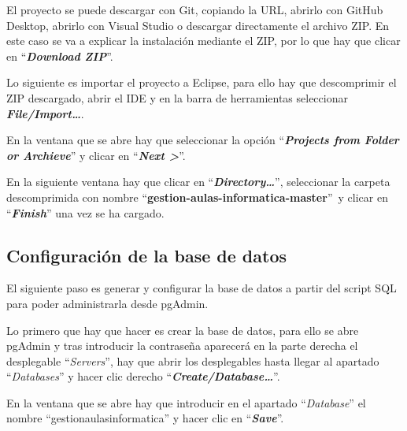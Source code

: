 El proyecto se puede descargar con Git, copiando la URL, abrirlo con GitHub Desktop, abrirlo con Visual Studio o descargar directamente el archivo ZIP. En este caso se va a explicar la instalación mediante el ZIP, por lo que hay que clicar en ``\textbf{\textit{Download ZIP}}''.


Lo siguiente es importar el proyecto a Eclipse, para ello hay que descomprimir el ZIP descargado, abrir el IDE y en la barra de herramientas seleccionar \textbf{\textit{File/Import\dots}}.


En la ventana que se abre hay que seleccionar la opción ``\textbf{\textit{Projects from Folder or Archieve}}'' y clicar en ``\textbf{\textit{Next >}}''.


En la siguiente ventana hay que clicar en ``\textbf{\textit{Directory\dots}}'', seleccionar la carpeta descomprimida con nombre ``\textbf{gestion-aulas-informatica-master}''\ y clicar en ``\textbf{\textit{Finish}}'' una vez se ha cargado.



\subsection{Configuración de la base de datos}
El siguiente paso es generar y configurar la base de datos a partir del script SQL para poder administrarla desde pgAdmin.

Lo primero que hay que hacer es crear la base de datos, para ello se abre pgAdmin y tras introducir la contraseña aparecerá en la parte derecha el desplegable ``\textit{Servers}'', hay que abrir los desplegables hasta llegar al apartado ``\textit{Databases}'' y hacer clic derecho ``\textbf{\textit{Create/Database\dots}}''. 


En la ventana que se abre hay que introducir en el apartado ``\textit{Database}'' el nombre ``gestionaulasinformatica'' y hacer clic en ``\textbf{\textit{Save}}''.


